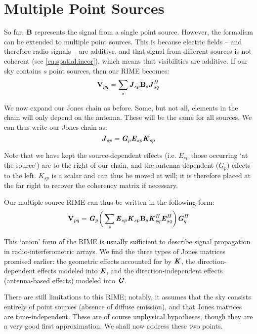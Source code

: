 \section{Multiple Point Sources}
\label{section.RIME.MultiplePointSources}

\pg
So far, $\textbf{B}$ represents the signal from a single point source. However, the formalism can be extended to multiple point sources. This is because electric fields -- and therefore radio signals -- are additive, and that signal from different sources is not coherent (see \cref{eq.spatial.incor}), which means that visibilities are additive. If our sky contains $s$ point sources, then our RIME becomes:
\begin{equation}
\textbf{V}_{pq} = \sum_s \textbf{\emph{J}}_{sp} \textbf{B}_s \textbf{\emph{J}}_{sq}^H
\end{equation}

\pg
We now expand our Jones chain as before. Some, but not all, elements in the chain will only depend on the antenna. These will be the same for all sources. We can thus write our Jones chain as:
\begin{equation}
\textbf{\emph{J}}_{sp} = \textbf{\emph{G}}_p \textbf{\emph{E}}_{sp} \textbf{\emph{K}}_{sp}
\end{equation}

\pg
Note that we have kept the source-dependent effects (i.e. $E_{sp}$ those occurring `at the source') are to the right of our chain, and the antenna-dependent ($G_p$) effects to the left. $K_{sp}$ is a scalar and can thus be moved at will; it is therefore placed at the far right to recover the coherency matrix if necessary.

\pg
Our multiple-source RIME can thus be written in the following form:
\begin{equation}\label{eq.multiple.source.RIME}
\textbf{V}_{pq} = \textbf{\emph{G}}_p \bigg( \sum_s \textbf{\emph{E}}_{sp} \textbf{\emph{K}}_{sp} \textbf{B}_{s} \textbf{\emph{K}}_{sq}^H \textbf{\emph{E}}_{sq}^H \bigg) \textbf{\emph{G}}_q^H
\end{equation}

\pg
This `onion' form of the RIME is usually sufficient to describe signal propagation in radio-interferometric arrays. We find the three types of Jones matrices promised earlier: the geometric effects accounted for by $\textbf{\emph{K}}$, the direction-dependent effects modeled into $\textbf{\emph{E}}$, and the direction-independent effects (antenna-based effects) modeled into $\textbf{\emph{G}}$.

\pg
There are still limitations to this RIME; notably, it assumes that the sky consists entirely of point sources (absence of diffuse emission), and that Jones matrices are time-independent. These are of course unphysical hypotheses, though they are a very good first approximation. We shall now address these two points.

